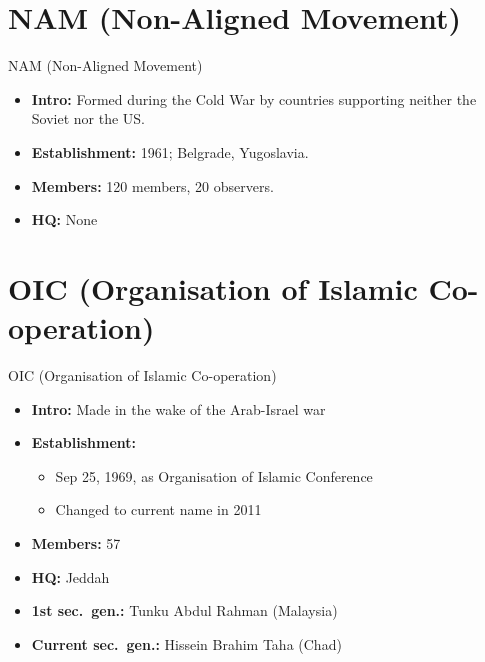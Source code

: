 \documentclass[
  10pt,
  ignorenonframetext,
  progressbar=frametitle]{beamer}
\providecommand{\tightlist}{%
  \setlength{\itemsep}{0pt}\setlength{\parskip}{0pt}}
\begin{document}
\section{NAM (Non-Aligned Movement)}
\begin{frame}[allowframebreaks]
{NAM (Non-Aligned Movement)}
\protect\hypertarget{nam-non-aligned-movement}{}
\begin{itemize}
\tightlist
\item
  \textbf{Intro:} Formed during the Cold War by countries supporting
  neither the Soviet nor the US.
\item
  \textbf{Establishment:} 1961; Belgrade, Yugoslavia.
\item
  \textbf{Members:} 120 members, 20 observers.
\item
  \textbf{HQ:} None
\end{itemize}
\end{frame}

\section{OIC (Organisation of Islamic Co-operation)}
\begin{frame}[allowframebreaks]
{OIC (Organisation of Islamic Co-operation)}
\protect\hypertarget{oic-organisation-of-islamic-co-operation}{}
\begin{itemize}
\tightlist
\item
  \textbf{Intro:} Made in the wake of the Arab-Israel war
\item
  \textbf{Establishment:}

  \begin{itemize}
  \tightlist
  \item
    Sep 25, 1969, as Organisation of Islamic Conference
  \item
    Changed to current name in 2011
  \end{itemize}
\item
  \textbf{Members:} 57
\item
  \textbf{HQ:} Jeddah
\item
  \textbf{1st sec.~gen.:} Tunku Abdul Rahman (Malaysia)
\item
  \textbf{Current sec.~gen.:} Hissein Brahim Taha (Chad)
\end{itemize}
\end{frame}
\end{document}
